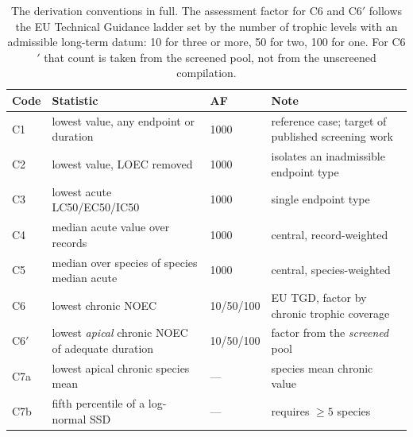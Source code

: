 \begin{table}[htbp]\centering\scriptsize\setlength{\tabcolsep}{2.4pt}
\caption{The derivation conventions in full. The assessment factor for C6 and C6$'$ follows the EU Technical Guidance ladder set by the number of trophic levels with an admissible long-term datum: 10 for three or more, 50 for two, 100 for one. For C6$'$ that count is taken from the screened pool, not from the unscreened compilation.}
\label{tab:s1}
\begin{tabular}{@{}l >{\raggedright\arraybackslash}p{} l >{\raggedright\arraybackslash}p{}@{}}\toprule
Code & Statistic & AF & Note\\\midrule
C1 & lowest value, any endpoint or duration & 1000 & reference case; target of published screening work\\
C2 & lowest value, \textsf{LOEC} removed & 1000 & isolates an inadmissible endpoint type\\
C3 & lowest acute \textsf{LC50}/\textsf{EC50}/\textsf{IC50} & 1000 & single endpoint type\\
C4 & median acute value over records & 1000 & central, record-weighted\\
C5 & median over species of species median acute & 1000 & central, species-weighted\\
C6 & lowest chronic \textsf{NOEC} & 10/50/100 & EU TGD, factor by chronic trophic coverage\\
C6$'$ & lowest \emph{apical} chronic \textsf{NOEC} of adequate duration & 10/50/100 & factor from the \emph{screened} pool\\
C7a & lowest apical chronic species mean & --- & species mean chronic value\\
C7b & fifth percentile of a log-normal SSD & --- & requires $\geq 5$ species\\
\bottomrule\end{tabular}\end{table}
